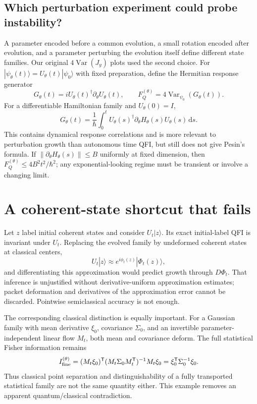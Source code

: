 \documentclass[11pt,a4paper]{article}
\DeclareMathOperator{\Var}{Var}
\newcommand{\dd}{\mathrm{d}}
\begin{document}
\subsection{Which perturbation experiment could probe instability?}
A parameter encoded before a common evolution, a small rotation encoded after evolution, and a parameter perturbing the evolution itself define different state families. Our original $4\Var(J_y)$ plots used the second choice. For $|\psi_\theta(t)\rangle=U_\theta(t)|\psi_0\rangle$ with fixed preparation, define the Hermitian response generator
\[G_\theta(t)=iU_\theta(t)^\dagger\partial_\theta U_\theta(t),\qquad F_Q^{(\theta)}=4\Var_{\psi_0}(G_\theta(t)).\]
For a differentiable Hamiltonian family and $U_\theta(0)=I$,
\[G_\theta(t)=\frac1\hbar\int_0^tU_\theta(s)^\dagger\partial_\theta H_\theta(s)U_\theta(s)\,\dd s.\]
This contains dynamical response correlations and is more relevant to perturbation growth than autonomous time QFI, but still does not give Pesin's formula. If $\|\partial_\theta H_\theta(s)\|\le B$ uniformly at fixed dimension, then $F_Q^{(\theta)}\le4B^2t^2/\hbar^2$; any exponential-looking regime must be transient or involve a changing limit.

\section{A coherent-state shortcut that fails}
Let $z$ label initial coherent states and consider $U_t|z\rangle$. Its exact initial-label QFI is invariant under $U_t$. Replacing the evolved family by undeformed coherent states at classical centers,
\[U_t|z\rangle\approx e^{i\phi_t(z)}|\Phi_t(z)\rangle,\]
and differentiating this approximation would predict growth through $D\Phi_t$. That inference is unjustified without derivative-uniform approximation estimates; packet deformation and derivatives of the approximation error cannot be discarded. Pointwise semiclassical accuracy is not enough.

The corresponding classical distinction is equally important. For a Gaussian family with mean derivative $\xi_0$, covariance $\Sigma_0$, and an invertible parameter-independent linear flow $M_t$, both mean and covariance deform. The full statistical Fisher information remains
\[I_{\rm fine}^{(\theta)}=(M_t\xi_0)^{\mathsf T}(M_t\Sigma_0M_t^{\mathsf T})^{-1}M_t\xi_0=\xi_0^{\mathsf T}\Sigma_0^{-1}\xi_0.\]
Thus classical point separation and distinguishability of a fully transported statistical family are not the same quantity either. This example removes an apparent quantum/classical contradiction.
\end{document}
